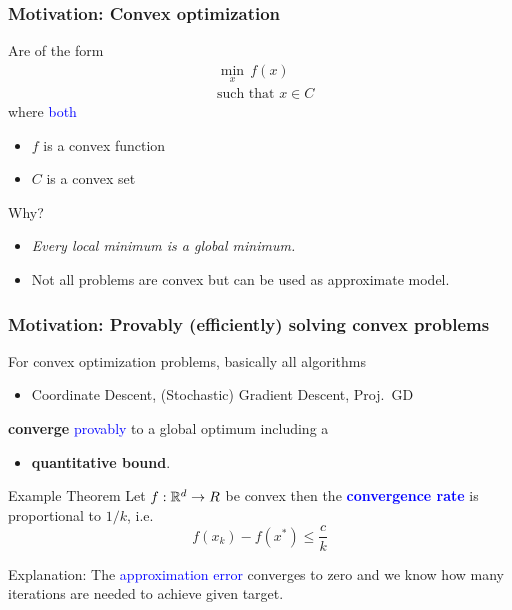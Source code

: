 \documentclass{beamer}
\begin{document}
\begin{frame}
  \frametitle{Motivation: Convex optimization}
  Are of the form
  \begin{equation}
    \begin{aligned}
      &\min_x \, f(x) \\
      &\text{such that $x\in C$}
    \end{aligned}
  \end{equation}
  where \textcolor{blue}{both}
  \begin{itemize}
    \item $f$ is a convex function
    \item $C$ is a convex set
  \end{itemize}
  Why?
  \begin{itemize}
    \item \textit{Every local minimum is a global minimum.}
    \item Not all problems are convex but can be used as approximate model.
  \end{itemize}

\end{frame}


\begin{frame}
  \frametitle{Motivation: Provably (efficiently) solving convex problems}
  For convex optimization problems, basically all algorithms
  \begin{itemize}
    \item Coordinate Descent, (Stochastic) Gradient Descent, Proj.\ GD
  \end{itemize}
  \textbf{converge} \textcolor{blue}{provably} to a global optimum including a
  \begin{itemize}
    \item \textbf{quantitative bound}.
  \end{itemize}

  \begin{block}{ Example Theorem }
    Let $f: \mathbb{R}^d \to R$ be convex then the \textbf{\textcolor{blue}{convergence rate}} is proportional to $1/k$, i.e.\
    \begin{equation}
      f(x_k) - f(x^*) \le \frac{c}{k}
    \end{equation}
  \end{block}
  Explanation: The \textcolor{blue}{approximation error} converges to zero and we know how many iterations are needed to achieve given target.
\end{frame}
\end{document}
